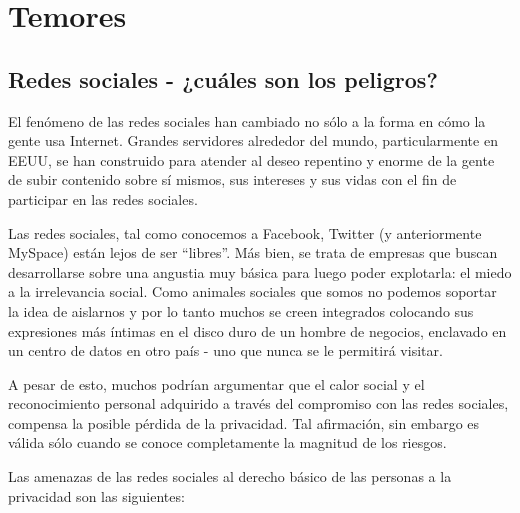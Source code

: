 \documentclass[10pt,a5paper,twoside,,]{book}
\begin{document}
\chapter{Temores}\label{temores-1}

\section{Redes sociales - ¿cuáles son los
peligros?}\label{redes-sociales---cuuxe1les-son-los-peligros}

El fenómeno de las redes sociales han cambiado no sólo a la forma en
cómo la gente usa Internet. Grandes servidores alrededor del mundo,
particularmente en EEUU, se han construido para atender al deseo
repentino y enorme de la gente de subir contenido sobre sí mismos, sus
intereses y sus vidas con el fin de participar en las redes sociales.

Las redes sociales, tal como conocemos a Facebook, Twitter (y
anteriormente MySpace) están lejos de ser ``libres''. Más bien, se trata
de empresas que buscan desarrollarse sobre una angustia muy básica para
luego poder explotarla: el miedo a la irrelevancia social. Como animales
sociales que somos no podemos soportar la idea de aislarnos y por lo
tanto muchos se creen integrados colocando sus expresiones más íntimas
en el disco duro de un hombre de negocios, enclavado en un centro de
datos en otro país - uno que nunca se le permitirá visitar.

A pesar de esto, muchos podrían argumentar que el calor social y el
reconocimiento personal adquirido a través del compromiso con las redes
sociales, compensa la posible pérdida de la privacidad. Tal afirmación,
sin embargo es válida sólo cuando se conoce completamente la magnitud de
los riesgos.

Las amenazas de las redes sociales al derecho básico de las personas a
la privacidad son las siguientes:
\end{document}
